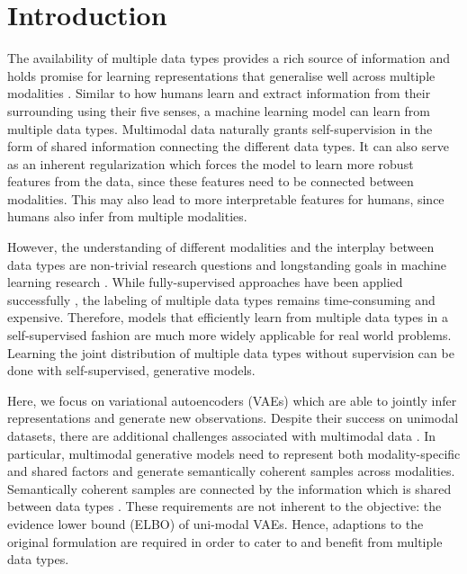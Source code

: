\section{Introduction}
The availability of multiple data types provides a rich source of information and holds promise for learning representations that generalise well across multiple modalities \parencite{baltrusaitis_multimodal_2019}.
Similar to how humans learn and extract information from their surrounding using their five senses, a machine learning model can learn from multiple data types.
Multimodal data naturally grants self-supervision in the form of shared information connecting the different data types.
It can also serve as an inherent regularization which forces the model to learn more robust features from the data, since these features need to be connected between modalities.
This may also lead to more interpretable features for humans, since humans also infer from multiple modalities.

However, the understanding of different modalities and the interplay between data types are non-trivial research questions and longstanding goals in machine learning research \citep{ngiam_multimodal_nodate}.
While fully-supervised approaches have been applied successfully \parencite{karpathy_deep_2015,tsai_learning_2018}, the labeling of multiple data types remains time-consuming and expensive.
Therefore, models that efficiently learn from multiple data types in a self-supervised fashion are much more widely applicable for real world problems.
Learning the joint distribution of multiple data types without supervision can be done with self-supervised, generative models.

Here, we focus on variational autoencoders (VAEs) \parencite{kingma_auto-encoding_2014,rezende_stochastic_2014} which are able to jointly infer representations and generate new observations.
Despite their success on unimodal datasets, there are additional challenges associated with multimodal data \parencite{suzuki_joint_2016, vedantam_generative_2018}.
In particular, multimodal generative models need to represent both modality-specific and shared factors and generate semantically coherent samples across modalities.
Semantically coherent samples are connected by the information which is shared between data types \parencite{shi_variational_2019}.
These requirements are not inherent to the objective: the evidence lower bound (ELBO) of uni-modal VAEs.
Hence, adaptions to the original formulation are required in order to cater to and benefit from multiple data types.


